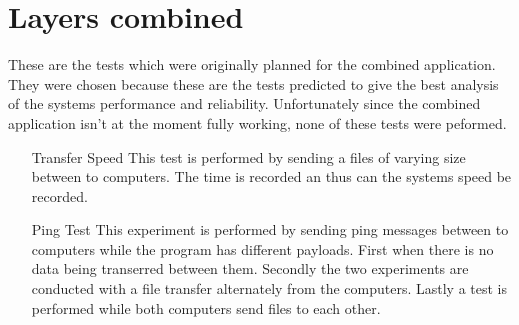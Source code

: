 \section{Layers combined}
These are the tests which were originally planned for the combined application. They were chosen because these are the tests predicted to give the best analysis of the systems performance and reliability. Unfortunately since the combined application isn't at the moment fully working, none of these tests were peformed.
\begin{itemize}
\item[Transfer Speed] This test is performed by sending a files of varying size between to computers. The time is recorded an thus can the systems speed be recorded.
\item[Ping Test] This experiment is performed by sending ping messages between to computers while the program has different payloads. First when there is no data being transerred between them. Secondly the two experiments are conducted with a file transfer alternately from the computers. Lastly a test is performed while both computers send files to each other.  
\end{itemize}
